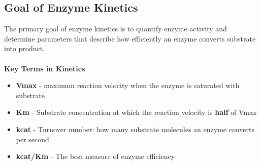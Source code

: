\documentclass[10pt]{article}
\begin{document}
\subsection*{Goal of Enzyme Kinetics}
The primary goal of enzyme kinetics is to quantify enzyme activity and determine parameters that describe how efficiently an enzyme converts substrate into product.\\\\
\textbf{Key Terms in Kinetics}
\begin{itemize}
    \item \textbf{Vmax} - maximum reaction velocity when the enzyme is saturated with substrate
    \item \textbf{Km} - Substrate concentration at which the reaction velocity is \textbf{half} of Vmax
    \item \textbf{kcat} - Turnover number: how many substrate molecules an enzyme converts per second
    \item \textbf{kcat/Km} - The best measure of enzyme efficiency
\end{itemize}
\end{document}

